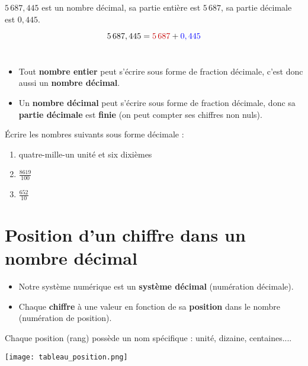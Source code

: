 \documentclass[a4paper,dvipsnames]{article}
\begin{document}
\begin{Ex}
$5 \,687,445$ est un nombre décimal, sa partie entière est $5 \,687$, sa partie décimale est $0,445$.

\[5 \,687,445 = \textcolor{red}{5\,687} + \textcolor{blue}{0,445}\]\\
\end{Ex}

\begin{Rqs}
\begin{itemize}
\item Tout \textbf{nombre entier} peut s'écrire sous forme de fraction décimale, c'est donc aussi un \textbf{nombre décimal}.
\item Un \textbf{nombre décimal} peut s'écrire sous forme de fraction décimale, donc sa \textbf{partie décimale} est \textbf{finie} (on peut compter ses chiffres non nuls).
\end{itemize}
\end{Rqs}

\begin{ExOApp}[]
Écrire les nombres suivants sous forme décimale :
\begin{enumerate}
\item quatre-mille-un unité et six dixièmes
\item $\frac{8619}{100}$
\item $\frac{652}{10}$
\end{enumerate}
\end{ExOApp}

\section{Position d'un chiffre dans un nombre décimal}

\begin{Def}
\begin{itemize}
\item Notre système numérique est un \textbf{système décimal} (numération décimale).
\item Chaque \textbf{chiffre} à une valeur en fonction de sa \textbf{position} dans le nombre (numération de position).
\end{itemize}
\end{Def}

\begin{Voc}
Chaque position (rang) possède un nom spécifique : unité, dizaine, centaines....
    
\begin{center}
    \texttt{[image: tableau\_position.png]}
\end{center}
\end{Voc} 
\end{document}
